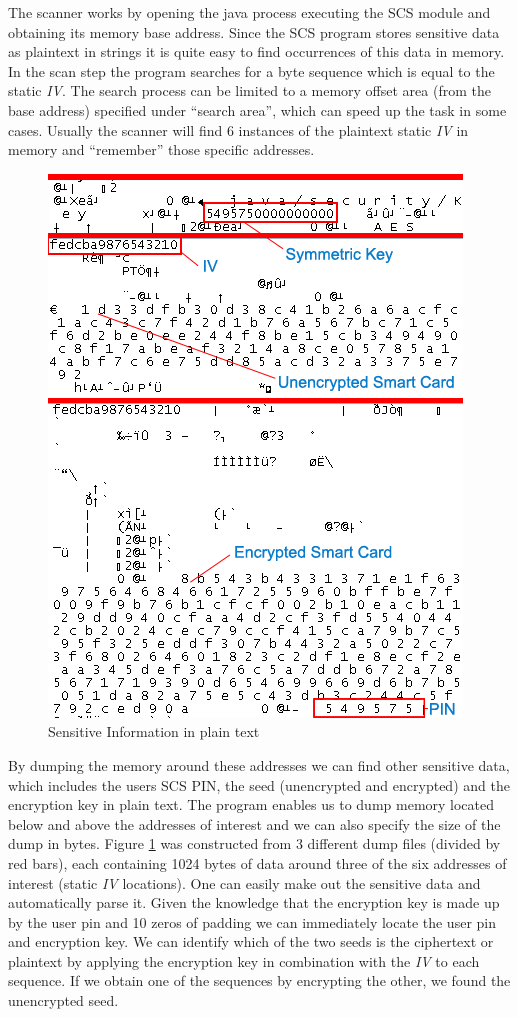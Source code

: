 \documentclass{llncs}
\begin{document}
The scanner works by opening the java process executing the SCS module and obtaining its memory base address. Since the SCS program stores sensitive data as plaintext in strings it is quite easy to find occurrences of this data in memory. In the scan step the program searches for a byte sequence which is equal to the static \emph{IV}. The search process can be limited to a memory offset area (from the base address) specified under ``search area'', which can speed up the task in some cases. Usually the scanner will find 6 instances of the plaintext static \emph{IV} in memory and ``remember'' those specific addresses.
\begin{center}
\begin{figure}[hbtp]
        \centering
        \includegraphics[scale=0.6]{dump.png}
        \caption{Sensitive Information in plain text}\label{figDump}
\end{figure}
\end{center}
By dumping the memory around these addresses we can find other sensitive data, which includes the users SCS PIN, the seed (unencrypted and encrypted) and the encryption key in plain text. The program enables us to dump memory located below and above the addresses of interest and we can also specify the size of the dump in bytes. Figure \ref{figDump} was constructed from 3 different dump files (divided by red bars), each containing 1024 bytes of data around three of the six addresses of interest (static \emph{IV} locations). One can easily make out the sensitive data and automatically parse it. Given the knowledge that the encryption key is made up by the user pin and 10 zeros of padding we can immediately locate the user pin and encryption key. We can identify which of the two seeds is the ciphertext or plaintext by applying the encryption key in combination with the \emph{IV} to each sequence. If we obtain one of the sequences by encrypting the other, we found the unencrypted seed.
\end{document}

